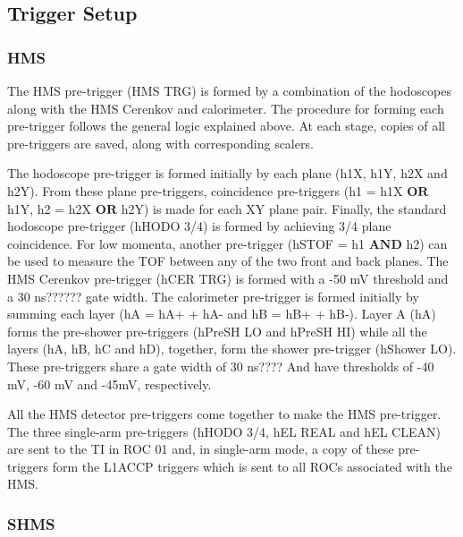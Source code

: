 \documentclass[
]{report}
\begin{document}
\hypertarget{trigger-setup}{%
\subsection{Trigger Setup}\label{trigger-setup}}

\hypertarget{hms}{%
\subsubsection{HMS}\label{hms}}

The HMS pre-trigger (HMS TRG) is formed by a combination of the
hodoscopes along with the HMS Cerenkov and calorimeter. The procedure
for forming each pre-trigger follows the general logic explained above.
At each stage, copies of all pre-triggers are saved, along with
corresponding scalers.

The hodoscope pre-trigger is formed initially by each plane (h1X, h1Y,
h2X and h2Y). From these plane pre-triggers, coincidence pre-triggers
(h1 = h1X \(\textbf{OR}\) h1Y, h2 = h2X \(\textbf{OR}\) h2Y) is made for
each XY plane pair. Finally, the standard hodoscope pre-trigger (hHODO
3/4) is formed by achieving 3/4 plane coincidence. For low momenta,
another pre-trigger (hSTOF = h1 \(\textbf{AND}\) h2) can be used to
measure the TOF between any of the two front and back planes. The HMS
Cerenkov pre-trigger (hCER TRG) is formed with a -50 mV threshold and a
30 ns?????? gate width. The calorimeter pre-trigger is formed initially
by summing each layer (hA = hA+ + hA- and hB = hB+ + hB-). Layer A (hA)
forms the pre-shower pre-triggers (hPreSH LO and hPreSH HI) while all
the layers (hA, hB, hC and hD), together, form the shower pre-trigger
(hShower LO). These pre-triggers share a gate width of 30 ns???? And
have thresholds of -40 mV, -60 mV and -45mV, respectively.

All the HMS detector pre-triggers come together to make the HMS
pre-trigger. The three single-arm pre-triggers (hHODO 3/4, hEL REAL and
hEL CLEAN) are sent to the TI in ROC 01 and, in single-arm mode, a copy
of these pre-triggers form the L1ACCP triggers which is sent to all ROCs
associated with the HMS.

\hypertarget{shms}{%
\subsubsection{SHMS}\label{shms}}
\end{document}
